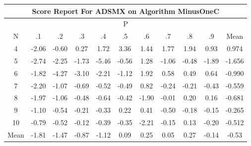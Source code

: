 \documentclass[11pt,a4paper]{report}
\begin{document}
\begin{longtable}{ | c || c | c | c | c | c | c | c | c | c || c |}
\hline
\multicolumn{11}{|c|}{ Score Report For ADSMX on Algorithm MinusOneC} \\
\hline
\multicolumn{11}{|c|}{ P } \\
\hline
N & .1 & .2 & .3 & .4 & .5 & .6 & .7 & .8 & .9 & Mean\\
 \hline
 \hline
 \endhead
  4 &  \cellcolor[HTML]{FFCFCF} -2.06 &  \cellcolor[HTML]{FFEFEF} -0.60 &  \cellcolor[HTML]{F7F7FF} 0.27 &  \cellcolor[HTML]{D7D7FF} 1.72 &  \cellcolor[HTML]{A7A7FF} 3.36 &  \cellcolor[HTML]{D7D7FF} 1.44 &  \cellcolor[HTML]{CFCFFF} 1.77 &  \cellcolor[HTML]{CFCFFF} 1.94 &  \cellcolor[HTML]{E7E7FF} 0.93 & 0.974 \\
  5 &  \cellcolor[HTML]{FFB7B7} -2.74 &  \cellcolor[HTML]{FFC7C7} -2.25 &  \cellcolor[HTML]{FFD7D7} -1.73 &  \cellcolor[HTML]{FF7878} -5.46 &  \cellcolor[HTML]{FFEFEF} -0.56 &  \cellcolor[HTML]{DFDFFF} 1.28 &  \cellcolor[HTML]{FFE7E7} -1.06 &  \cellcolor[HTML]{FFEFEF} -0.48 &  \cellcolor[HTML]{FFCFCF} -1.89 & -1.656 \\
  6 &  \cellcolor[HTML]{FFCFCF} -1.82 &  \cellcolor[HTML]{FF9797} -4.27 &  \cellcolor[HTML]{FFAFAF} -3.10 &  \cellcolor[HTML]{FFC7C7} -2.21 &  \cellcolor[HTML]{FFDFDF} -1.12 &  \cellcolor[HTML]{CFCFFF} 1.92 &  \cellcolor[HTML]{EFEFFF} 0.58 &  \cellcolor[HTML]{EFEFFF} 0.49 &  \cellcolor[HTML]{EFEFFF} 0.64 & -0.990 \\
  7 &  \cellcolor[HTML]{FFC7C7} -2.20 &  \cellcolor[HTML]{FFE7E7} -1.07 &  \cellcolor[HTML]{FFEFEF} -0.69 &  \cellcolor[HTML]{FFEFEF} -0.52 &  \cellcolor[HTML]{FFEFEF} -0.49 &  \cellcolor[HTML]{E7E7FF} 0.82 &  \cellcolor[HTML]{FFF7F7} -0.24 &  \cellcolor[HTML]{FFF7F7} -0.21 &  \cellcolor[HTML]{FFF7F7} -0.43 & -0.559 \\
  8 &  \cellcolor[HTML]{FFCFCF} -1.97 &  \cellcolor[HTML]{FFE7E7} -1.06 &  \cellcolor[HTML]{FFEFEF} -0.48 &  \cellcolor[HTML]{FFEFEF} -0.64 &  \cellcolor[HTML]{FFF7F7} -0.42 &  \cellcolor[HTML]{FFCFCF} -1.90 &  \cellcolor[HTML]{FFFFFF} -0.01 &  \cellcolor[HTML]{F7F7FF} 0.20 &  \cellcolor[HTML]{F7F7FF} 0.16 & -0.681 \\
  9 &  \cellcolor[HTML]{FFE7E7} -1.10 &  \cellcolor[HTML]{FFEFEF} -0.54 &  \cellcolor[HTML]{FFF7F7} -0.21 &  \cellcolor[HTML]{FFF7F7} -0.33 &  \cellcolor[HTML]{F7F7FF} 0.22 &  \cellcolor[HTML]{F7F7FF} 0.41 &  \cellcolor[HTML]{FFEFEF} -0.50 &  \cellcolor[HTML]{FFF7F7} -0.18 &  \cellcolor[HTML]{FFFFFF} -0.15 & -0.265 \\
  10 &  \cellcolor[HTML]{FFEFEF} -0.79 &  \cellcolor[HTML]{FFEFEF} -0.52 &  \cellcolor[HTML]{FFFFFF} -0.12 &  \cellcolor[HTML]{FFF7F7} -0.39 &  \cellcolor[HTML]{FFF7F7} -0.35 &  \cellcolor[HTML]{FFC7C7} -2.21 &  \cellcolor[HTML]{FFFFFF} -0.15 &  \cellcolor[HTML]{FFFFFF} 0.13 &  \cellcolor[HTML]{FFF7F7} -0.20 & -0.512 \\
 \hline
 \hline
Mean &  \cellcolor[HTML]{FFCFCF} -1.81 &  \cellcolor[HTML]{FFD7D7} -1.47 &  \cellcolor[HTML]{FFE7E7} -0.87 &  \cellcolor[HTML]{FFDFDF} -1.12 &  \cellcolor[HTML]{FFFFFF} 0.09 &  \cellcolor[HTML]{F7F7FF} 0.25 &  \cellcolor[HTML]{FFFFFF} 0.05 &  \cellcolor[HTML]{F7F7FF} 0.27 &  \cellcolor[HTML]{FFFFFF} -0.14 &  \cellcolor[HTML]{FFEFEF} -0.53
\end{longtable}
\end{document}
